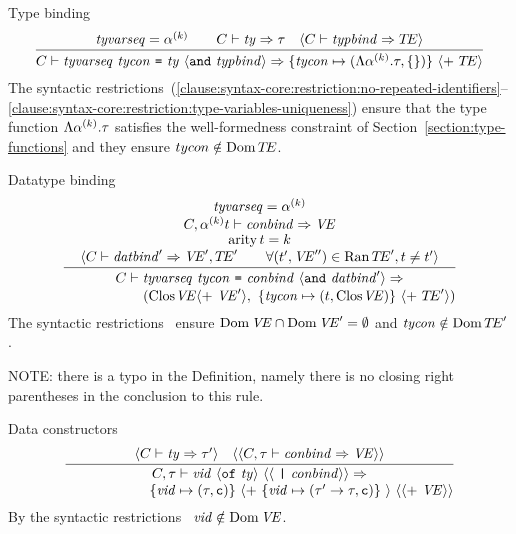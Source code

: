 \begin{sml-rule}{Type binding}
\begin{equation}\label{rule:static-core:type-binding}
  \vcenter{\infer{\C\ts\longtypbind\ra\{\tycon\mapsto(\typefcnk,\emptymap)\}\ \optional{+\ \TE}}
    {\tyvarseq=\alphak\qquad\C\ts\ty\ra\tau
      & \langle\C\ts\typbind\ra\TE\rangle}}
\end{equation}
The syntactic restrictions~(\oldS\oldS\ref{clause:syntax-core:restriction:no-repeated-identifiers}--\ref{clause:syntax-core:restriction:type-variables-uniqueness}) ensure that the type function
$\Lambda\mbox{$\alpha^{(k)}$}.\tau$ satisfies the well-formedness constraint of 
Section~\ref{section:type-functions} and they ensure $tycon\notin\mathop{\rm Dom}\nolimits\mbox{$T\!E$}$.
\end{sml-rule}


\begin{sml-rule}{Datatype binding}
\begin{equation}\label{rule:static-core:datatype-binding}
  \vcenter{\infer{\deduce{\qquad\phantom{\C\ts}\qquad(\cl{}{\VE}\langle +\ \VE'\rangle,\
        \{\tycon\mapsto(\t,\cl{}{\VE})\}\ \langle +\ \TE'\rangle)}{\C\ts\newlongdatbind\ra}}
    {\deduce{\optional{\C\ts\datbind'\ra\VE',\TE'\qquad
        \forall(\t',\VE'')\in\Ran\TE', \t\neq\t'}}
      {\deduce{\arity\t=k}
        {\deduce{\C,\alphakt\ts\constrs\ra\VE}
          {\tyvarseq=\alphak}}}}}
\end{equation}
The syntactic restrictions~ ensure $\mathop{\rm Dom}\nolimits\textit{V\kern-.05emE\/}\cap\mathop{\rm Dom}\nolimits\textit{V\kern-.05emE\/}' = \emptyset$
and $\textit{tycon\/}\notin\mathop{\rm Dom}\nolimits\mbox{$T\!E$}'$.

NOTE: there is a typo in the Definition, namely there is no closing
right parentheses in the conclusion to this rule.
\end{sml-rule}


\begin{sml-rule}{Data constructors}
\begin{equation}\label{rule:static-core:data-constructors}
  \vcenter{\infer{\deduce{\qquad\qquad\qquad\{\vid\mapsto(\tau,\isc)\}\
        \optional{+\ \{\vid\mapsto(\tau'\to\tau,\isc)\}\ }\
        \optional{\optional{+\ \VE}}}
      {\C,\tau\ts\longervidconstrs\ra}}
    {\optional{\C\ts\ty\ra\tau'}
  & \optional{\optional{\C,\tau\ts\constrs\ra\VE}}}}
\end{equation}
By the syntactic restrictions~ $\textit{vid\/}\notin\mathop{\rm Dom}\nolimits\textit{V\kern-.05emE\/}$.
\end{sml-rule}

